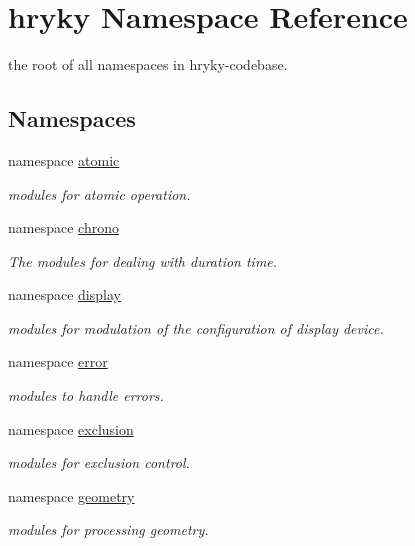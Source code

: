 \hypertarget{namespacehryky}{\section{hryky Namespace Reference}
\label{namespacehryky}
}


the root of all namespaces in hryky-\/codebase.  


\subsection*{Namespaces}
\begin{DoxyCompactItemize}
\item 
namespace \hyperlink{namespacehryky_1_1atomic}{atomic}
\begin{DoxyCompactList}\small\item\em modules for atomic operation. \end{DoxyCompactList}\item 
namespace \hyperlink{namespacehryky_1_1chrono}{chrono}
\begin{DoxyCompactList}\small\item\em The modules for dealing with duration time. \end{DoxyCompactList}\item 
namespace \hyperlink{namespacehryky_1_1display}{display}
\begin{DoxyCompactList}\small\item\em modules for modulation of the configuration of display device. \end{DoxyCompactList}\item 
namespace \hyperlink{namespacehryky_1_1error}{error}
\begin{DoxyCompactList}\small\item\em modules to handle errors. \end{DoxyCompactList}\item 
namespace \hyperlink{namespacehryky_1_1exclusion}{exclusion}
\begin{DoxyCompactList}\small\item\em modules for exclusion control. \end{DoxyCompactList}\item 
namespace \hyperlink{namespacehryky_1_1geometry}{geometry}
\begin{DoxyCompactList}\small\item\em modules for processing geometry. \end{DoxyCompactList}\item 

\end{DoxyCompactItemize}
